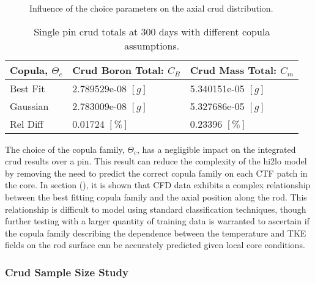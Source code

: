 \begin{figure}[H]%
    \centering
    \qquad
    \caption[]{Influence of the choice parameters on the axial crud distribution.}%
    \label{fig:crud_copula_fam_sensi}%
\end{figure}


\begin{table}[h]
    \begin{center}
        \caption[Crud totals with different copula assumptions.]{Single pin crud totals at 300 days with different copula assumptions.}
        \begin{tabular}[h]{|l | l | l |}
            \hline
            Copula, $\Theta_c$ & Crud Boron Total: $C_B$ & Crud Mass Total: $C_m$ \\
            \hline
            Best Fit &  2.789529e-08 $[g]$ & 5.340151e-05 $[g]$ \\
            Gaussian &  2.783009e-08 $[g]$ & 5.327686e-05 $[g]$ \\
            \hline
            Rel Diff &  0.01724 $[\%]$ & 0.23396 $[\%]$ \\
            \hline
        \end{tabular}
        \label{tab:crud_totals_copula}
    \end{center}
\end{table}

The choice of the copula family, $\Theta_c$, has a negligible impact on the integrated crud results over a pin.  This result can reduce the complexity of the hi2lo model by removing the need to predict the correct copula family on each CTF patch in the core.  In section (), it is shown that CFD data exhibits a complex relationship between the best fitting copula family and the axial position along the rod.  This relationship is difficult to model using standard classification techniques, though further testing with a larger quantity of training data is warranted to ascertain if the copula family describing the dependence between the temperature and TKE fields on the rod surface can be accurately predicted given local core conditions.

\subsubsection{Crud Sample Size Study}

